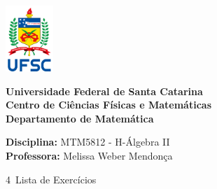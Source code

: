\documentclass[12pt]{article}
\begin{document}
\ \vspace{-1.4cm}
\begin{tcolorbox}[colback=black!0]
    \noindent
    \begin{minipage}{0.14\linewidth}
        \hspace*{-0.2cm}\includegraphics[height = 2.5cm]{UFSC.png}
    \end{minipage}
	\noindent
	\begin{minipage}{0.79\linewidth}
	    \begin{center}
	        \vspace*{0.2cm}
	        {\bf \large Universidade Federal de Santa Catarina} \\ \vspace{0.3cm}
			{\bf \large Centro de Ciências Físicas e Matemáticas} \\ \vspace{0.3cm}
			{\bf \large Departamento de Matemática}
		\end{center}
	\end{minipage}
\end{tcolorbox}

\noindent\textbf{Disciplina:} MTM5812 - H-Álgebra II\\
\textbf{Professora:} Melissa Weber Mendonça

\begin{center}
    \Large{4\textordfeminine\ Lista de Exercícios}
\end{center}
\end{document}
